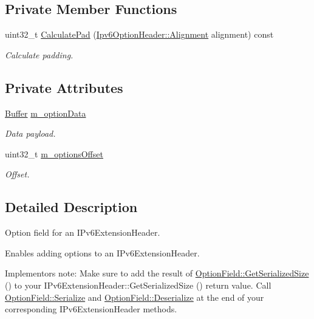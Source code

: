 \subsection*{Private Member Functions}
\begin{DoxyCompactItemize}
\item 
uint32\+\_\+t \hyperlink{classns3_1_1OptionField_ac3fd1a6232d5a5885feccda8b6f70a31}{Calculate\+Pad} (\hyperlink{structns3_1_1Ipv6OptionHeader_1_1Alignment}{Ipv6\+Option\+Header\+::\+Alignment} alignment) const 
\begin{DoxyCompactList}\small\item\em Calculate padding. \end{DoxyCompactList}\end{DoxyCompactItemize}
\subsection*{Private Attributes}
\begin{DoxyCompactItemize}
\item 
\hyperlink{classns3_1_1Buffer}{Buffer} \hyperlink{classns3_1_1OptionField_a915db445f931653af7165be5cc9d8ba5}{m\+\_\+option\+Data}
\begin{DoxyCompactList}\small\item\em Data payload. \end{DoxyCompactList}\item 
uint32\+\_\+t \hyperlink{classns3_1_1OptionField_af4da0b51e27677c953ae9dac5aa911e7}{m\+\_\+options\+Offset}
\begin{DoxyCompactList}\small\item\em Offset. \end{DoxyCompactList}\end{DoxyCompactItemize}


\subsection{Detailed Description}
Option field for an I\+Pv6\+Extension\+Header. 

Enables adding options to an I\+Pv6\+Extension\+Header.

Implementor\textquotesingle{}s note\+: Make sure to add the result of \hyperlink{classns3_1_1OptionField_a7ed57dda4ddd5f4409ffb692594fb924}{Option\+Field\+::\+Get\+Serialized\+Size} () to your I\+Pv6\+Extension\+Header\+::\+Get\+Serialized\+Size () return value. Call \hyperlink{classns3_1_1OptionField_a9cd4cd7b17a7e443a17dcfcfadef4c28}{Option\+Field\+::\+Serialize} and \hyperlink{classns3_1_1OptionField_a8df2abe90be59cebdcca83b1e1708ba5}{Option\+Field\+::\+Deserialize} at the end of your corresponding I\+Pv6\+Extension\+Header methods. 

